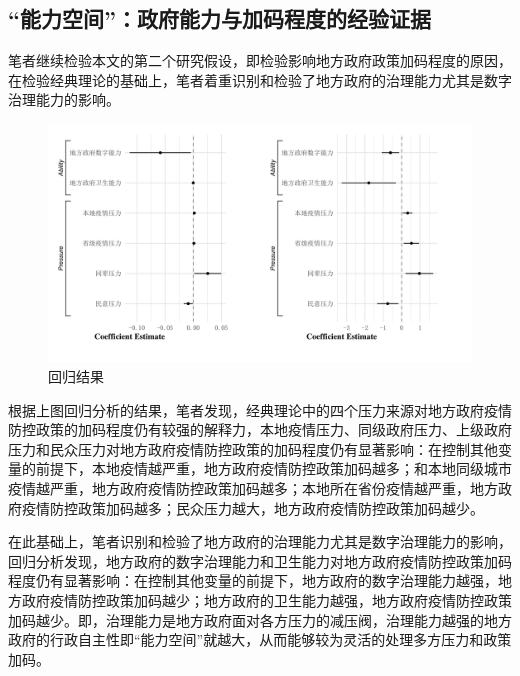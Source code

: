 \documentclass[
  12pt,
]{ctexart}
\begin{document}
\hypertarget{ux80fdux529bux7a7aux95f4ux653fux5e9cux80fdux529bux4e0eux52a0ux7801ux7a0bux5ea6ux7684ux7ecfux9a8cux8bc1ux636e}{%
\subsection{``能力空间''：政府能力与加码程度的经验证据}\label{ux80fdux529bux7a7aux95f4ux653fux5e9cux80fdux529bux4e0eux52a0ux7801ux7a0bux5ea6ux7684ux7ecfux9a8cux8bc1ux636e}}

笔者继续检验本文的第二个研究假设，即检验影响地方政府政策加码程度的原因，在检验经典理论的基础上，笔者着重识别和检验了地方政府的治理能力尤其是数字治理能力的影响。

\begin{figure}[h]
\includegraphics[width=1\linewidth]{../figures/figure1} \caption{回归结果}\label{fig:unnamed-chunk-5}
\end{figure}

根据上图回归分析的结果，笔者发现，经典理论中的四个压力来源对地方政府疫情防控政策的加码程度仍有较强的解释力，本地疫情压力、同级政府压力、上级政府压力和民众压力对地方政府疫情防控政策的加码程度仍有显著影响：在控制其他变量的前提下，本地疫情越严重，地方政府疫情防控政策加码越多；和本地同级城市疫情越严重，地方政府疫情防控政策加码越多；本地所在省份疫情越严重，地方政府疫情防控政策加码越多；民众压力越大，地方政府疫情防控政策加码越少。

在此基础上，笔者识别和检验了地方政府的治理能力尤其是数字治理能力的影响，回归分析发现，地方政府的数字治理能力和卫生能力对地方政府疫情防控政策加码程度仍有显著影响：在控制其他变量的前提下，地方政府的数字治理能力越强，地方政府疫情防控政策加码越少；地方政府的卫生能力越强，地方政府疫情防控政策加码越少。即，治理能力是地方政府面对各方压力的减压阀，治理能力越强的地方政府的行政自主性即``能力空间''就越大，从而能够较为灵活的处理多方压力和政策加码。
\end{document}
